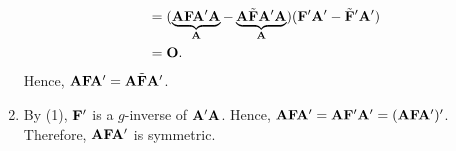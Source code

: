 \begin{Theorem}{}{}
\begin{enumerate}[(1)]
\begin{align*}
                   & =(\underbrace{\mathbf{A}\mathbf{F}\mathbf{A}'\mathbf{A}}_{\mathbf{A}}-\underbrace{\mathbf{A}\tilde{\mathbf{F}}\mathbf{A}'\mathbf{A}}_{\mathbf{A}})(\mathbf{F}'\mathbf{A}'-\tilde{\mathbf{F}}'\mathbf{A}') \\
                   & =\mathbf{O}.
              \end{align*}
              Hence, $ \mathbf{A}\mathbf{F}\mathbf{A}'=\mathbf{A}\tilde{\mathbf{F}}\mathbf{A}' $.
        \item By (1), $ \mathbf{F}' $ is a $ g $-inverse of $ \mathbf{A}'\mathbf{A} $. Hence,
              $ \mathbf{A}\mathbf{F}\mathbf{A}'=\mathbf{A}\mathbf{F}'\mathbf{A}'=(\mathbf{A}\mathbf{F}\mathbf{A}')' $.
              Therefore, $ \mathbf{A}\mathbf{F}\mathbf{A}' $ is symmetric.
    \end{enumerate}
\end{Theorem}
